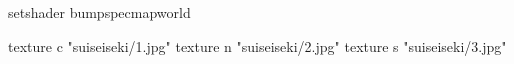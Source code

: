 setshader bumpspecmapworld

	texture c "suiseiseki/1.jpg"
	texture n "suiseiseki/2.jpg"
	texture s "suiseiseki/3.jpg"
